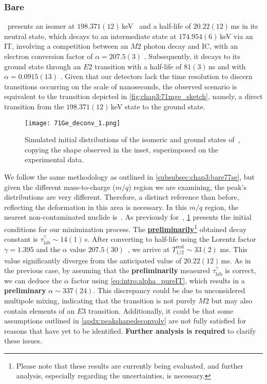\subsubsection{Bare \,}

\, presents an isomer at $198.371(12)$\,keV~\cite{ENSDF} and a half-life of $20.22(12)$\,ms \cite{ENSDF} in its neutral state, which decays to an intermediate state at $174.954 (6)$\,keV via an \textsc{IT}, involving a competition between an $M2$ photon decay and \textsc{IC}, with an electron conversion factor of $\alpha = 207.5 (3)$ \cite{ENSDF}. Subsequently, it decays to its ground state through an $E2$ transition with a half-life of $81(3)$\,ns and with $\alpha = 0.0915(13)$ \cite{ENSDF}. 
Given that our detectors lack the time resolution to discern transitions occurring on the scale of nanoseconds, the observed scenario is equivalent to the transition depicted in \cref{fig:chap3:71mge_sketch}, namely, a direct transition from the $198.371(12)$\,keV state to the ground state.
\begin{figure}[hbt]
  \centering
  \texttt{[image: 71Ge\_deconv\_1.png]}
  \caption{Simulated initial distributions of the isomeric and ground states of \,, copying the shape observed in the inset, superimposed on the experimental data.}
  \label{fig:chap3:71Ge32h125deconvolution}
\end{figure}

We follow the same methodology as outlined in \cref{subsubsec:chap3:bare77se}, but given the different mass-to-charge ($m/q$) region we are examining, the peak's distributions are very different. Therefore, a distinct reference than before, reflecting the deformation in this area is necessary. In this $m/q$ region, the nearest non-contaminated nuclide is \,.
As previously for \,, \cref{fig:chap3:71Ge32h125deconvolution} presents the initial conditions for our minimization process. 
The \underline{\textbf{preliminarily}}\footnote{Please note that these results are currently being evaluated, and further analysis, especially regarding the uncertainties, is necessary.
} obtained decay constant is $\tau_{\mathrm{lab}}^{\gamma} \sim 14(1)$\,s. After converting to half-life using the Lorentz factor $\gamma = 1.395$ and the $\alpha$ value $207.5(30)$~\cite{KIBEDI2008202}, we arrive at $T_{1/2}^{\mathrm{rest}} \sim 33(2)$ ms. This value significantly diverges from the anticipated value of $20.22(12)$\,ms.
As in the previous case, by assuming that the \textbf{preliminarily} measured $\tau_{\mathrm{lab}}^{\gamma}$ is correct, we can deduce the $\alpha$ factor using \cref{eq:intro:alpha_pureIT}, which results in a \textbf{preliminary} $\alpha \sim 337(24)$.
This discrepancy could be due to unconsidered multipole mixing, indicating that the transition is not purely $M2$ but may also contain elements of an $E3$ transition. Additionally, it could be that some assumptions outlined in \cref{apdx:peakshapedeconvolv} are not fully satisfied for reasons that have yet to be identified. \textbf{Further analysis is required} to clarify these issues.

